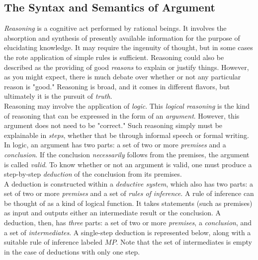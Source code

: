 



\subsection{The Syntax and Semantics of Argument}

\textit{Reasoning} is a cognitive act performed by rational beings. It involves the absorption and synthesis of presently available information for the purpose of elucidating knowledge. It may require the ingenuity of thought, but in some cases the rote application of simple rules is sufficient. Reasoning could also be described as the providing of good \textit{reasons} to explain or justify things. However, as you might expect, there is much debate over whether or not any particular reason is "good." Reasoning is broad, and it comes in different flavors, but ultimately it is the pursuit of \textit{truth}. \\

Reasoning may involve the application of \textit{logic}. This \textit{logical reasoning} is the kind of reasoning that can be expressed in the form of an \textit{argument}. However, this argument does not need to be "correct." Such reasoning simply must be explainable in \textit{steps}, whether that be through informal speech or formal writing. \\

In logic, an argument has two parts: a set of two or more \textit{premises} and a \textit{conclusion}. If the conclusion \textit{necessarily} follows from the premises, the argument is called \textit{valid}. To know whether or not an argument is valid, one must produce a step-by-step \textit{deduction} of the conclusion from its premises. \\

A deduction is constructed within a \textit{deductive system}, which also has two parts: a set of two or more \textit{premises} and a set of \textit{rules of inference}. A rule of inference can be thought of as a kind of logical function. It takes statements (such as premises) as input and outputs either an intermediate result or the conclusion. A deduction, then, has \textit{three} parts: a set of two or more \textit{premises}, a \textit{conclusion}, and a set of \textit{intermediates}. A single-step deduction is represented below, along with a suitable rule of inference labeled $MP$. Note that the set of intermediates is empty in the case of deductions with only one step. \\[2mm]

